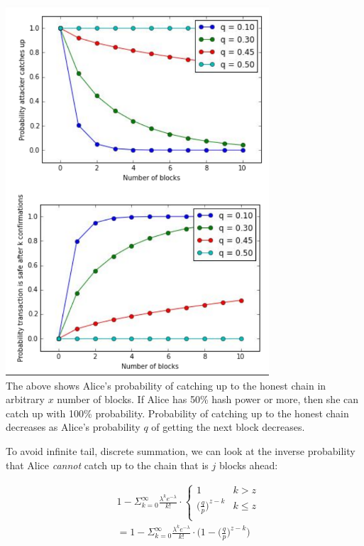 \documentclass[11pt]{article}
\begin{document}
      \includegraphics[scale=1]{doublespend_plots} \\
   
    The above shows Alice's probability of catching up to the honest chain in arbitrary $x$ number of blocks. If Alice has 50\% hash power or more, then she can catch up with 100\% probability. Probability of catching up to the honest chain decreases as Alice's probability $q$ of getting the next block decreases.
    
    To avoid infinite tail, discrete summation, we can look at the inverse probability that Alice \textit{cannot} catch up to the chain that is $j$ blocks ahead:
    
    \begin{equation*}
        \begin{split}
           & 1 - \Sigma_{k=0}^\infty \frac{\lambda^k e^{-\lambda}}{k!} \cdot  \left\{
    \begin{array}{ll}
      1  & k > z \\ 
      \big(\frac{q}{p}\big)^{z-k} & k \leq z \\
    \end{array}
  \right. \\
  &= 1 -\Sigma_{k=0}^\infty \frac{\lambda^k e^{-\lambda}}{k!} \cdot \Bigg(1- \big(\frac{q}{p}\big)^{z-k}\Bigg)
        \end{split}
    \end{equation*}
    
\end{document}
